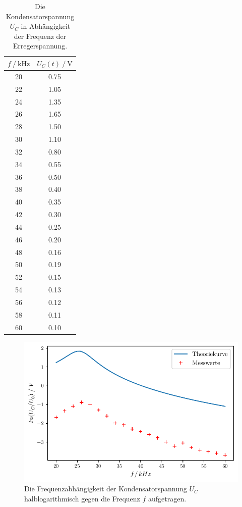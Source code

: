 \begin{table}[H]
  \centering
  \caption{Die Kondensatorspannung $U_C$ in Abhängigkeit der Frequenz der Erregerspannung.}
  \begin{tabular}{cc}
    \toprule
    {$f \mathbin{/} \unit{\kilo\hertz}$} &
    {$U_C(t) \mathbin{/} \unit{\volt}$} \\
    \midrule
    20 & 0.75 \\
    22 & 1.05 \\
    24 & 1.35 \\
    26 & 1.65 \\
    28 & 1.50 \\
    30 & 1.10 \\
    32 & 0.80 \\
    34 & 0.55 \\
    36 & 0.50 \\
    38 & 0.40 \\
    40 & 0.35 \\
    42 & 0.30 \\
    44 & 0.25 \\
    46 & 0.20 \\
    48 & 0.16 \\
    50 & 0.19 \\
    52 & 0.15 \\
    54 & 0.13 \\
    56 & 0.12 \\
    58 & 0.11 \\
    60 & 0.10 \\

    \bottomrule
  \end{tabular}
  \label{tab:Tabelle1}
\end{table}



\begin{figure}
  \centering
  \includegraphics{build/plotc.pdf}
  \caption{Die Frequenzabhängigkeit der Kondensatorspannung $U_C$ halblogarithmisch gegen die Frequenz $f$ aufgetragen.}
  \label{fig:plotc}
\end{figure}



